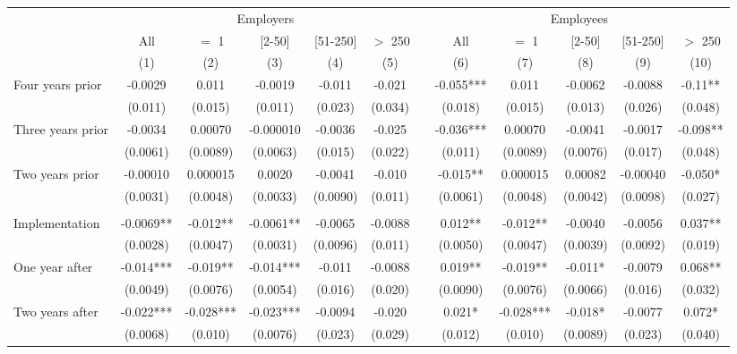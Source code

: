 \begin{tabular}{lccccccccccc}
\toprule
      & \multicolumn{5}{c}{Employers }        &       & \multicolumn{5}{c}{Employees} \\
\cmidrule{2-6}\cmidrule{8-12}      & All   & $=$ 1 & [2-50] & [51-250] & $>$ 250 &       & All   & $=$ 1 & [2-50] & [51-250] & $>$ 250 \\
\midrule
      & (1)   & (2)   & (3)   & (4)   & (5)   &       & (6)   & (7)   & (8)   & (9)   & (10) \\
\midrule
\midrule
Four years prior & -0.0029 & 0.011 & -0.0019 & -0.011 & -0.021 &       & -0.055*** & 0.011 & -0.0062 & -0.0088 & -0.11** \\
      & (0.011) & (0.015) & (0.011) & (0.023) & (0.034) &       & (0.018) & (0.015) & (0.013) & (0.026) & (0.048) \\
Three years prior & -0.0034 & 0.00070 & -0.000010 & -0.0036 & -0.025 &       & -0.036*** & 0.00070 & -0.0041 & -0.0017 & -0.098** \\
      & (0.0061) & (0.0089) & (0.0063) & (0.015) & (0.022) &       & (0.011) & (0.0089) & (0.0076) & (0.017) & (0.048) \\
Two years prior & -0.00010 & 0.000015 & 0.0020 & -0.0041 & -0.010 &       & -0.015** & 0.000015 & 0.00082 & -0.00040 & -0.050* \\
      & (0.0031) & (0.0048) & (0.0033) & (0.0090) & (0.011) &       & (0.0061) & (0.0048) & (0.0042) & (0.0098) & (0.027) \\
      &       &       &       &       &       &       &       &       &       &       &  \\
Implementation & -0.0069** & -0.012** & -0.0061** & -0.0065 & -0.0088 &       & 0.012** & -0.012** & -0.0040 & -0.0056 & 0.037** \\
      & (0.0028) & (0.0047) & (0.0031) & (0.0096) & (0.011) &       & (0.0050) & (0.0047) & (0.0039) & (0.0092) & (0.019) \\
One year after & -0.014*** & -0.019** & -0.014*** & -0.011 & -0.0088 &       & 0.019** & -0.019** & -0.011* & -0.0079 & 0.068** \\
      & (0.0049) & (0.0076) & (0.0054) & (0.016) & (0.020) &       & (0.0090) & (0.0076) & (0.0066) & (0.016) & (0.032) \\
Two years after & -0.022*** & -0.028*** & -0.023*** & -0.0094 & -0.020 &       & 0.021* & -0.028*** & -0.018* & -0.0077 & 0.072* \\
      & (0.0068) & (0.010) & (0.0076) & (0.023) & (0.029) &       & (0.012) & (0.010) & (0.0089) & (0.023) & (0.040) \\

\end{tabular}

